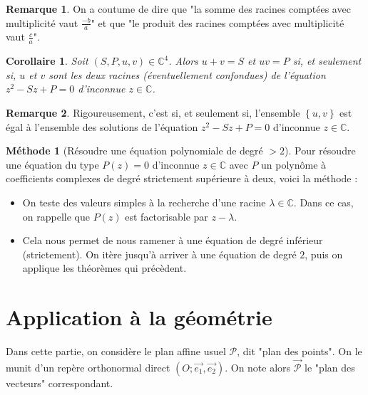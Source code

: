 \documentclass[french]{book}
\newcommand{\C}{\mathbb{C}}
\theoremstyle{plain}
\newtheorem{cor}{Corollaire}[chapter]
\theoremstyle{definition}
\newtheorem{rmq}{Remarque}[chapter]
\newtheorem{met}{Méthode}[chapter]
\theoremstyle{remark}
\begin{document}
\begin{rmq}
	On a coutume de dire que "la somme des racines comptées avec multiplicité vaut $\displaystyle\frac{-b}{a}$" et que "le produit des racines comptées avec multiplicité vaut $\displaystyle\frac{c}{a}$". 
\end{rmq}
\begin{cor}
	Soit $(S,P,u,v)\in\C^4$. Alors $u+v=S$ et $uv=P$ si, et seulement si, $u$ et $v$ sont les deux racines (éventuellement confondues) de l'équation $z^2-Sz+P=0$ d'inconnue $z\in\C$.
\end{cor}
\begin{rmq}
	Rigoureusement, c'est si, et seulement si, l'ensemble $\left\{u,v\right\}$ est égal à l'ensemble des solutions de l'équation $z^2-Sz+P=0$ d'inconnue $z\in\C$.
\end{rmq}
\begin{met}[Résoudre une équation polynomiale de degré $>2$]
	Pour résoudre une équation du type $P(z)=0$ d'inconnue $z\in\C$ avec $P$ un polynôme à coefficients complexes de degré strictement supérieure à deux, voici la méthode : 
	\begin{itemize}
		\item On teste des valeurs simples à la recherche d'une racine $\lambda\in\C$. Dans ce cas, on rappelle que $P(z)$ est factorisable par $z-\lambda$.
		\item Cela nous permet de nous ramener à une équation de degré inférieur (strictement). On itère jusqu'à arriver à une équation de degré $2$, puis on applique les théorèmes qui précèdent.
	\end{itemize}
\end{met}
\section{Application à la géométrie}
Dans cette partie, on considère le plan affine usuel $\mathcal{P}$, dit "plan des points". On le munit d'un repère orthonormal direct $(O;\overrightarrow{e_1},\overrightarrow{e_2})$. On note alors $\overrightarrow{\mathcal{P}}$ le "plan des vecteurs" correspondant.
\end{document}
